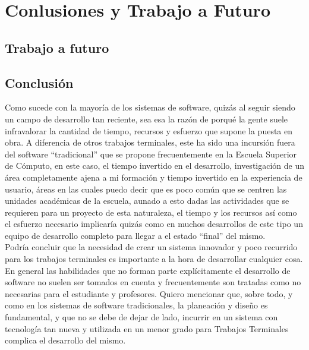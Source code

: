 \chapter{Conlusiones y Trabajo a Futuro}

\section{Trabajo a futuro}

\section{Conclusión}
Como sucede con la mayoría de los sistemas de software, quizás al seguir siendo un campo de desarrollo tan reciente, sea esa la razón de porqué la gente suele infravalorar la cantidad de tiempo, recursos y esfuerzo que supone la puesta en obra. A diferencia de otros trabajos terminales, este ha sido una incursión fuera del software “tradicional” que se propone frecuentemente en la Escuela Superior de Cómputo, en este caso, el tiempo invertido en el desarrollo, investigación de un área completamente ajena a mi formación y tiempo invertido en la experiencia de usuario, áreas en las cuales puedo decir que es poco común que se centren las unidades académicas de la escuela, aunado a esto dadas las actividades que se requieren para un proyecto de esta naturaleza, el tiempo y los recursos así como el esfuerzo necesario implicaría quizás como en muchos desarrollos de este tipo un equipo de desarrollo completo para llegar a el estado “final” del mismo.\\
 
Podría concluir que la necesidad de crear un sistema innovador y poco recurrido para los trabajos terminales es importante a la hora de desarrollar cualquier cosa.\\

En general las habilidades que no forman parte explícitamente el desarrollo de software no suelen ser tomados en cuenta y frecuentemente son tratadas como no necesarias para el estudiante y profesores. Quiero mencionar que, sobre todo, y como en los sistemas de software tradicionales, la planeación y diseño es fundamental, y que no se debe de dejar de lado, incurrir en un sistema con tecnología tan nueva y utilizada en un menor grado para Trabajos Terminales complica el desarrollo del mismo.\\

